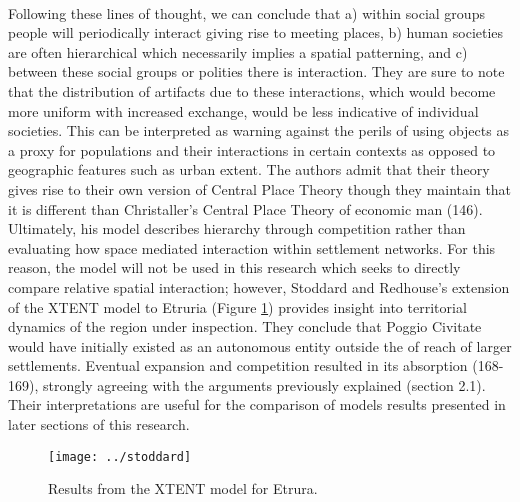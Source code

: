 \documentclass[12pt,a4paper]{thesis}
\begin{document}
\paragraph{}
Following these lines of thought, we can conclude that a) within social groups people will periodically interact giving rise to meeting places, b) human societies are often hierarchical  which necessarily implies a spatial patterning, and c) between these social groups or polities there is interaction. They are sure to note that the distribution of artifacts due to these interactions, which would become more uniform with increased  exchange, would be less indicative of individual societies. This can be interpreted as warning against the perils of using objects as a proxy for populations and their interactions in certain contexts as opposed to geographic features such as urban extent. The authors admit that their theory gives rise to their own version of Central Place Theory though they maintain that it is different than Christaller's Central Place Theory of economic man (146). Ultimately, his model describes hierarchy through competition rather than evaluating how space mediated interaction within settlement networks. For this reason, the model will not be used in this research which seeks to directly compare relative spatial interaction; however, Stoddard and Redhouse's \citeyearpar{StoRed11} extension of the XTENT model to Etruria (Figure \ref{fig:stoddard}) provides insight into territorial dynamics of the region under inspection. They conclude that Poggio Civitate would have initially existed as an autonomous entity outside the of reach of larger settlements. Eventual expansion and competition resulted in its absorption (168-169), strongly agreeing with the arguments previously explained (section 2.1). Their interpretations are useful for the comparison of models results presented in later sections of this research. 

\begin{figure}
\centering
\texttt{[image: ../stoddard]}
\caption{Results from the XTENT model for Etrura.}
\label{fig:stoddard}
\end{figure}
\end{document}
